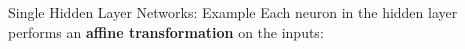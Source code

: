 \begin{frame} {Single Hidden Layer Networks: Example}
Each neuron in the hidden layer performs an \textbf{affine transformation} on the inputs:
\begin{figure}
\centering
{}

\end{figure}
\end{frame}
